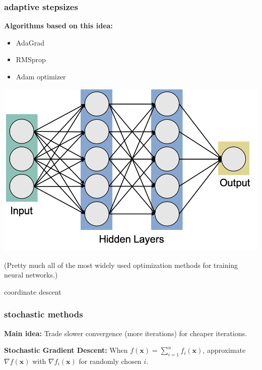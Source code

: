 \documentclass[compress]{beamer}
\newcommand{\bv}[1]{\mathbf{#1}}
\begin{document}
\begin{frame}
	\frametitle{adaptive stepsizes}
	\textbf{Algorithms based on this idea:}
	\begin{itemize}
		\item AdaGrad
		\item RMSprop
		\item Adam optimizer
	\end{itemize}
\begin{center}
	\includegraphics[width=.5\textwidth]{neuralNetwork.png}
	
	\alert{(Pretty much all of the most widely used optimization methods for training neural networks.)}
\end{center}
\end{frame}

\begin{frame}[standout]
	\begin{center}
		\large coordinate descent
	\end{center}
\end{frame}

\begin{frame}
	\frametitle{stochastic methods}
	\textbf{Main idea:} Trade slower convergence (more iterations) for cheaper iterations. 
	\vspace{2em}
	
	\textbf{Stochastic Gradient Descent:}
	When $f(\bv{x}) = \sum_{i=1}^n f_i(\bv{x})$, approximate $\nabla f(\bv{x})$ with $\nabla f_i(\bv{x})$ for randomly chosen $i$. 
\end{frame}
\end{document}
